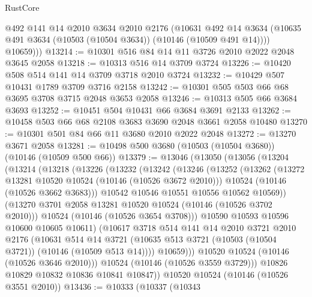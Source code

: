 \begin{lexlean}{RustCore}
\begin{coremodule}
          @492
          @141
          @14
          @2010
          @3634
          @2010
          @2176
          (@10631
            @492
            @14
            @3634
            (@10635 @491 @3634 (@10503 (@10504 @3634)) (@10146 (@10509 @491 @14))))
          @10659)))
@13214 := @10301 @516 @84 @14 @11 @3726 @2010 @2022 @2048 @3645 @2058
@13218 := @10313 @516 @14 @3709 @3724
@13226 := @10420 @508 @514 @141 @14 @3709 @3718 @2010 @3724
@13232 := @10429 @507 @10431 @1789 @3709 @3716 @2158
@13242 := @10301 @505 @503 @66 @68 @3695 @3708 @3715 @2048 @3653 @2058
@13246 := @10313 @505 @66 @3684 @3693
@13252 := @10451 @504 @10431 @66 @3684 @3691 @2133
@13262 := @10458 @503 @66 @68 @2108 @3683 @3690 @2048 @3661 @2058 @10480
@13270 := @10301 @501 @84 @66 @11 @3680 @2010 @2022 @2048
@13272 := @13270 @3671 @2058
@13281 := @10498 @500 @3680 (@10503 (@10504 @3680)) (@10146 (@10509 @500 @66))
@13379 := @13046
    (@13050
      (@13056
        (@13204
          (@13214
            (@13218
              (@13226
                (@13232
                  (@13242
                    (@13246
                      (@13252
                        (@13262
                          (@13272 @13281 @10520 @10524 (@10146 (@10526 @3672 @2010)))
                          @10524
                          (@10146 (@10526 @3662 @3683)))
                        @10542
                        @10546
                        @10551
                        @10556
                        @10562
                        @10569))
                    (@13270 @3701 @2058 @13281 @10520 @10524 (@10146 (@10526 @3702 @2010)))
                    @10524
                    (@10146 (@10526 @3654 @3708)))
                  @10590
                  @10593
                  @10596
                  @10600
                  @10605
                  @10611)
                (@10617
                  @3718
                  @514
                  @141
                  @14
                  @2010
                  @3721
                  @2010
                  @2176
                  (@10631
                    @514
                    @14
                    @3721
                    (@10635 @513 @3721 (@10503 (@10504 @3721)) (@10146 (@10509 @513 @14))))
                  @10659)))
            @10520
            @10524
            (@10146 (@10526 @3646 @2010)))
          @10524
          (@10146 (@10526 @3559 @3729)))
        @10826
        @10829
        @10832
        @10836
        @10841
        @10847))
    @10520
    @10524
    (@10146 (@10526 @3551 @2010))
@13436 := @10333
    (@10337
      (@10343

\end{coremodule}
\end{lexlean}
